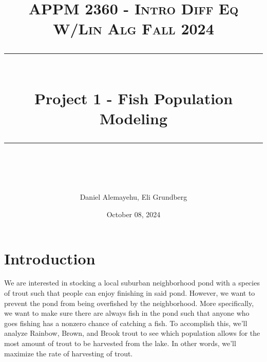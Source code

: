 \documentclass[letterpaper,12pt]{article}
\title{
\normalfont \normalsize 
\textsc{APPM 2360 - Intro Diff Eq W/Lin Alg \hfill Fall 2024} \\
[10pt] 
\rule{\linewidth}{0.5pt} \\[6pt] 
\huge Project 1 - Fish Population Modeling \\
\rule{\linewidth}{2pt}  \\[10pt]
}
\date{October 08, 2024}
\author{Daniel Alemayehu, Eli Grundberg}
\begin{document}
\begin{titlingpage}
\maketitle
\end{titlingpage}
\newpage
\tableofcontents
\newpage

\section{Introduction}
We are interested in stocking a local suburban neighborhood pond with a species of trout such that people can enjoy finishing in said pond. 
However, we want to prevent the pond from being overfished by the neighborhood.
More specifically, we want to make sure there are always fish in the pond such that anyone who goes fishing has a nonzero chance of catching a fish. 
To accomplish this, we'll analyze Rainbow, Brown, and Brook trout to see which population allows for the most amount of trout to be harvested from the lake.
In other words, we'll maximize the rate of harvesting of trout.
\end{document}
